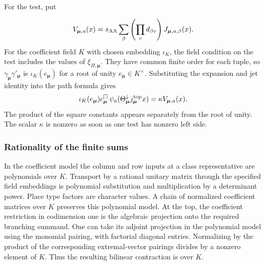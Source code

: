For the test, put

\[
 V_{\boldsymbol\mu,a}(x)=s_{\rm AA}\sum_{\beta}
      \left(\prod_v d_{\beta v}\right)J_{\boldsymbol\mu,a,\beta}(x).
\]
For the coefficient field \(K\) with chosen embedding \(\iota_K\),
the field condition on the test includes the values of
\(\xi_{H,\boldsymbol\mu}\). They have common finite order for each
tuple, so \(\gamma_{\boldsymbol\mu}\gamma'_{\boldsymbol\mu}\)
is \(\iota_K(e_{\boldsymbol\mu})\) for a root of unity
\(e_{\boldsymbol\mu}\in K^\times\). Substituting the expansion and
jet identity into the path formula gives
\begin{equation}
\label{eq:period-principal-test}
 \iota_K(e_{\boldsymbol\mu})c^\square_{\boldsymbol\mu}\,
 \psi_a(\Theta_{\boldsymbol\mu}^{\downarrow}j_{\boldsymbol\mu}^{\rm top}x)
     =\kappa V_{\boldsymbol\mu,a}(x).
\end{equation}
The product of the square constants appears separately from the
root of unity. The scalar \(\kappa\) is nonzero as soon as one test
has nonzero left side.

\subsubsection{Rationality of the finite sums}
In the coefficient model the column and row inputs at a class
representative are polynomials over \(K\). Transport by a rational
unitary matrix through the specified field embeddings is polynomial
substitution and multiplication by a determinant power.
Place type factors are character values. A chain of normalized
coefficient matrices over \(K\) preserves this polynomial model.
At the top, the coefficient restriction in codimension one is
the algebraic projection onto the required branching summand.
One can take its adjoint projection in the polynomial model
using the monomial pairing, with factorial diagonal entries.
Normalizing by the product of the corresponding extremal-vector
pairings divides by a nonzero element of \(K\). Thus the resulting
bilinear contraction is over \(K\).

